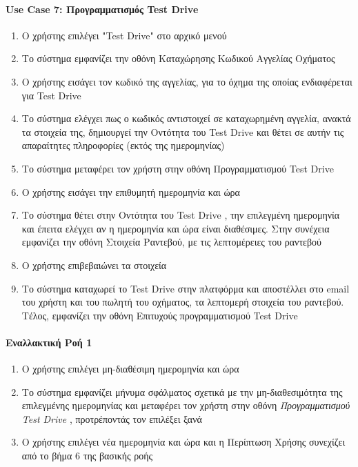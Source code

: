 \documentclass{../ol-softwaremanual}
\begin{document}
	
	\newpage
	\centering
	\paragraph{\en Use Case 7: \gr Προγραμματισμός \en Test Drive \gr}
	
	\begin{enumerate}
		\item Ο χρήστης επιλέγει \en"Test Drive" \gr στο αρχικό μενού
		\item Το σύστημα εμφανίζει την οθόνη Καταχώρησης Κωδικού Αγγελίας Οχήματος
		\item Ο χρήστης εισάγει τον κωδικό της αγγελίας, για το όχημα της οποίας ενδιαφέρεται για \en Test Drive \gr
		\item Το σύστημα ελέγχει πως ο κωδικός αντιστοιχεί σε καταχωρημένη αγγελία, ανακτά τα στοιχεία της,  
		δημιουργεί την Οντότητα του \en Test Drive \gr και θέτει σε αυτήν τις απαραίτητες πληροφορίες (εκτός της ημερομηνίας)
		\item Το σύστημα μεταφέρει τον χρήστη στην οθόνη Προγραμματισμού \en Test Drive \gr 
		\item Ο χρήστης εισάγει την επιθυμητή ημερομηνία και ώρα		
		\item Το σύστημα θέτει στην Οντότητα του \en Test Drive \gr, την επιλεγμένη ημερομηνία και έπειτα ελέγχει αν η ημερομηνία και ώρα είναι διαθέσιμες. Στην συνέχεια εμφανίζει την οθόνη Στοιχεία Ραντεβού, με τις λεπτομέρειες του ραντεβού
		\item Ο χρήστης επιβεβαιώνει τα στοιχεία
		\item Το σύστημα καταχωρεί το \en Test Drive \gr στην πλατφόρμα και αποστέλλει στο \en email \gr του χρήστη και του πωλητή του οχήματος, τα λεπτομερή στοιχεία του ραντεβού. Τέλος, εμφανίζει την οθόνη Επιτυχούς προγραμματισμού \en Test Drive \gr 
	\end{enumerate}
	
	\paragraph{Εναλλακτική Ροή 1}
	
	\begin{enumerate}
		\item Ο χρήστης επιλέγει μη-διαθέσιμη ημερομηνία και ώρα
		\item Το σύστημα εμφανίζει μήνυμα σφάλματος σχετικά με την μη-διαθεσιμότητα της επιλεγμένης ημερομηνίας και μεταφέρει τον χρήστη στην οθόνη \textit{Προγραμματισμού \en Test Drive \gr}, προτρέποντάς τον επιλέξει ξανά
		\item Ο χρήστης επιλέγει νέα ημερομηνία και ώρα και η Περίπτωση Χρήσης συνεχίζει από το βήμα 6 της βασικής ροής
	\end{enumerate}
	
\end{document}
